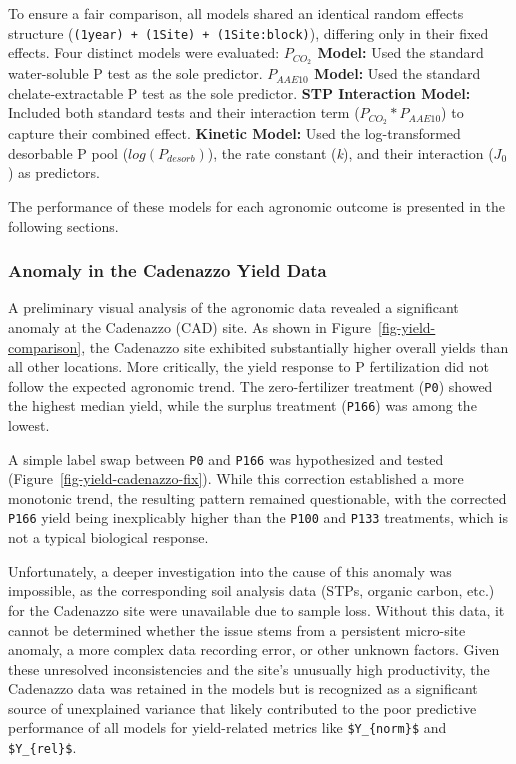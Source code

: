\documentclass[
  a4paper,
]{article}
\begin{document}
To ensure a fair comparison, all models shared an identical random
effects structure
(\texttt{(1\textbar{}year)\ +\ (1\textbar{}Site)\ +\ (1\textbar{}Site:block)}),
differing only in their fixed effects. Four distinct models were
evaluated: \textbf{\(P_{CO_2}\) Model:} Used the standard water-soluble
P test as the sole predictor. \textbf{\(P_{AAE10}\) Model:} Used the
standard chelate-extractable P test as the sole predictor. \textbf{STP
Interaction Model:} Included both standard tests and their interaction
term (\(P_{CO_2} * P_{AAE10}\)) to capture their combined effect.
\textbf{Kinetic Model:} Used the log-transformed desorbable P pool
(\(log(P_{desorb})\)), the rate constant (\emph{k}), and their
interaction (\(J_0\)) as predictors.

The performance of these models for each agronomic outcome is presented
in the following sections.

\subsubsection{Anomaly in the Cadenazzo Yield
Data}\label{anomaly-in-the-cadenazzo-yield-data}

A preliminary visual analysis of the agronomic data revealed a
significant anomaly at the Cadenazzo (CAD) site. As shown in
Figure~\ref{fig-yield-comparison}, the Cadenazzo site exhibited
substantially higher overall yields than all other locations. More
critically, the yield response to P fertilization did not follow the
expected agronomic trend. The zero-fertilizer treatment (\texttt{P0})
showed the highest median yield, while the surplus treatment
(\texttt{P166}) was among the lowest.

A simple label swap between \texttt{P0} and \texttt{P166} was
hypothesized and tested (Figure~\ref{fig-yield-cadenazzo-fix}). While
this correction established a more monotonic trend, the resulting
pattern remained questionable, with the corrected \texttt{P166} yield
being inexplicably higher than the \texttt{P100} and \texttt{P133}
treatments, which is not a typical biological response.

Unfortunately, a deeper investigation into the cause of this anomaly was
impossible, as the corresponding soil analysis data (STPs, organic
carbon, etc.) for the Cadenazzo site were unavailable due to sample
loss. Without this data, it cannot be determined whether the issue stems
from a persistent micro-site anomaly, a more complex data recording
error, or other unknown factors. Given these unresolved inconsistencies
and the site's unusually high productivity, the Cadenazzo data was
retained in the models but is recognized as a significant source of
unexplained variance that likely contributed to the poor predictive
performance of all models for yield-related metrics like
\texttt{\$Y\_\{norm\}\$} and \texttt{\$Y\_\{rel\}\$}.
\end{document}
